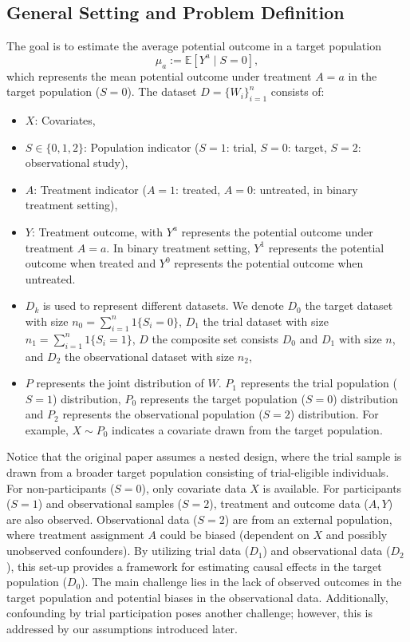 \documentclass[12pt, oneside]{amsart}
\theoremstyle{definition}
\theoremstyle{remark}
\numberwithin{equation}{section}
\begin{document}
\subsection{General Setting and Problem Definition}
The goal is to estimate the average potential outcome in a target population
\[
\mu_a := \mathbb{E}[Y^a \mid S = 0],
\]
which represents the mean potential outcome under treatment $A = a$ in the target population ($S = 0$). The dataset $D = \{W_i\}_{i=1}^n$ consists of:
\begin{itemize}
    \item $X$: Covariates, 
    \item $S \in \{0, 1, 2\}$: Population indicator ($S = 1$: trial, $S = 0$: target, $S = 2$: observational study),
    \item $A$: Treatment indicator ($A = 1$: treated, $A = 0$: untreated, in binary treatment setting),
    \item $Y$: Treatment outcome, with $Y^a$ represents the potential outcome under treatment $A = a$. In binary treatment setting, $Y^1$ represents the potential outcome when treated and $Y^0$ represents the potential outcome when untreated.
    \item $D_k$ is used to represent different datasets. We denote $D_0$ the target dataset with size $n_0 = \sum_{i=1}^n 1 \{S_i = 0\}$, $D_1$ the trial dataset with size $n_1 = \sum_{i=1}^n 1 \{S_i = 1\}$, $D$ the composite set consists $D_0$ and $D_1$ with size $n$, and $D_2$ the observational dataset with size $n_2$,
    \item $P$ represents the joint distribution of $W$. $P_1$ represents the trial population ($S = 1$) distribution, $P_0$ represents the target population ($S = 0$) distribution and $P_2$ represents the observational population ($S = 2$) distribution. For example, $X \sim P_0$ indicates a covariate drawn from the target population.
\end{itemize}


Notice that the original paper assumes a nested design, where the trial sample is drawn from a broader target population consisting of trial-eligible individuals. For non-participants ($S = 0$), only covariate data $X$ is available. For participants ($S = 1$) and observational samples ($S = 2$), treatment and outcome data ($A, Y$) are also observed. Observational data ($S = 2$) are from an external population, where treatment assignment $A$ could be biased (dependent on $X$ and possibly unobserved confounders). By utilizing trial data ($D_1$) and observational data ($D_2$), this set-up provides a framework for estimating causal effects in the target population ($D_0$). The main challenge lies in the lack of observed outcomes in the target population and potential biases in the observational data. Additionally, confounding by trial participation poses another challenge; however, this is addressed by our assumptions introduced later.\\
\end{document}
